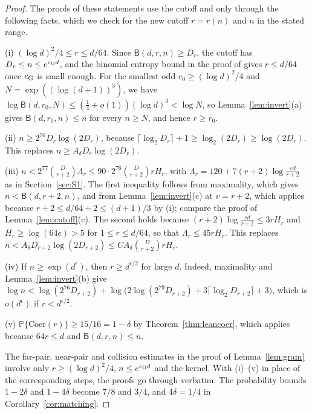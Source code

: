 \documentclass[11pt]{article}
\theoremstyle{definition}\newtheorem{assumption}[theorem]{Assumption}
\theoremstyle{remark}\newtheorem{remark}[theorem]{Remark}
\newcommand{\Pp}{\mathbb P}
\begin{document}
\begin{proof}
The proofs of these statements use the cutoff and
\cite[Lemma~4.4]{subcritical} only through the following facts, which we
check for the new cutoff $r=r(n)$ and $n$ in the stated range.

(i) $(\log d)^2/4\le r\le d/64$. Since $\mathsf B(d,r,n)\ge D_r$, the
cutoff has $D_r\le n\le e^{c_{\rm G}d}$, and the binomial entropy bound in
the proof of \cite[Lemma~6.4]{subcritical} gives $r\le d/64$ once
$c_{\rm G}$ is small enough. For the smallest odd $r_0\ge(\log d)^2/4$ and
$N=\exp((\log(d+1))^3)$, we have
$\log\mathsf B(d,r_0,N)\le(\frac14+o(1))(\log d)^3<\log N$, so
Lemma~\ref{lem:invert}(a) gives $\mathsf B(d,r_0,n)\le n$ for every
$n\ge N$, and hence $r\ge r_0$.

(ii) $n\ge2^{76}D_r\log(2D_r)$, because
$\lceil\log_2D_r\rceil+1\ge\log_2(2D_r)\ge\log(2D_r)$. This replaces
$n\ge A_\delta D_r\log(2D_r)$.

(iii) $n<2^{77}\binom D{r+2}\Lambda_r\le90\cdot2^{76}\binom D{r+2}rH_r$,
with $\Lambda_r=120+7(r+2)\log\frac{ed}{r+2}$ as in Section~\ref{sec:S1}.
The first inequality follows from maximality, which gives
$n<\mathsf B(d,r+2,n)$, and from Lemma~\ref{lem:invert}(c) at $v=r+2$,
which applies because $r+2\le d/64+2\le(d+1)/3$ by (i); compare the proof
of Lemma~\ref{lem:cutoff}(c). The second holds because
$(r+2)\log\frac{ed}{r+2}\le3rH_r$ and $H_r\ge\log(64e)>5$ for
$1\le r\le d/64$, so that $\Lambda_r\le45rH_r$. This replaces
$n<A_\delta D_{r+2}\log(2D_{r+2})\le CA_\delta\binom D{r+2}rH_r$.

(iv) If $n\ge\exp(d^\epsilon)$, then $r\ge d^{\epsilon/2}$ for large $d$.
Indeed, maximality and Lemma~\ref{lem:invert}(b) give
$\log n<\log(2^{76}D_{r+2})+\log\bigl(2\log(2^{79}D_{r+2})
+3\lceil\log_2D_{r+2}\rceil+3\bigr)$, which is $o(d^\epsilon)$ if
$r<d^{\epsilon/2}$.

(v) $\Pp\{\mathrm{Coer}(r)\}\ge15/16=1-\delta$ by
Theorem~\ref{thm:leancoer}, which applies because $64r\le d$ and
$\mathsf B(d,r,n)\le n$.

The far-pair, near-pair and collision estimates in the proof of
Lemma~\ref{lem:gram} involve only $r\ge(\log d)^2/4$,
$n\le e^{c_{\rm G}d}$ and the kernel. With (i)--(v) in place of the
corresponding steps, the proofs go through verbatim. The probability bounds
$1-2\delta$ and $1-4\delta$ become $7/8$ and $3/4$, and $4\delta=1/4$ in
Corollary~\ref{cor:matching}.
\end{proof}
\end{document}
